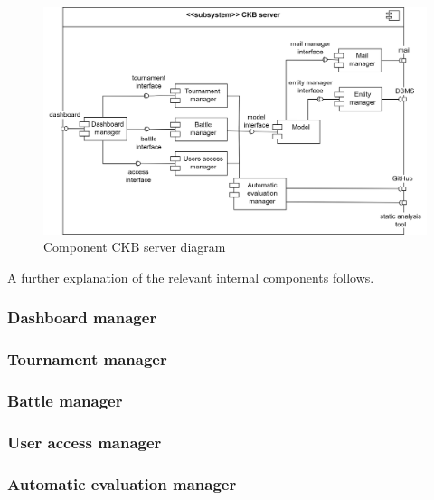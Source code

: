\begin{figure}[h]
    \centering
    \includegraphics[width=\textwidth]{images/component-CKBserver.png}
    \caption{Component CKB server diagram}
    \label{fig:comp-CKBserver}
\end{figure}

A further explanation of the relevant internal components follows.

\subsubsection*{Dashboard manager}
\subsubsection*{Tournament manager}
\subsubsection*{Battle manager}
\subsubsection*{User access manager}
\subsubsection*{Automatic evaluation manager}

\clearpage

